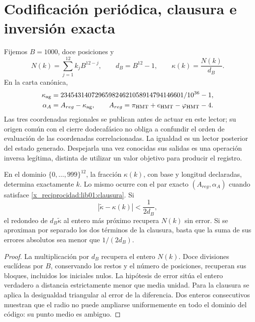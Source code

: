 \section{Codificación periódica, clausura e inversión exacta}
\label{x_reciprocidad:lib01:kappa}

Fijemos \(B=1000\), doce posiciones y
\[
 N(k)=\sum_{j=1}^{12}k_jB^{12-j},\qquad d_B=B^{12}-1,
 \qquad \kappa(k)=\frac{N(k)}{d_B}.
\]
En la carta canónica,
\begin{equation}
 \begin{aligned}
 \kappa_{\rm ag}
 &=\frac{234543140729659824621058914794146601}{10^{36}-1},\\
 \alpha_A&=A_{reg}-\kappa_{\rm ag},\qquad
 A_{reg}=\pi_{\rm HMT}+e_{\rm HMT}-\varphi_{\rm HMT}-4.
 \end{aligned}
 \label{x_reciprocidad:lib01:clausura}
\end{equation}
Las tres coordenadas regionales se publican antes de actuar en este lector;
su origen común con el cierre dodecafásico no obliga a confundir el orden de
evaluación de las coordenadas correlacionadas. La igualdad es un lector
posterior del estado generado. Despejarla una vez conocidas sus salidas es
una operación inversa legítima, distinta de utilizar un valor objetivo para
producir el registro.

\begin{proposition}
\label{x_reciprocidad:lib01:inversion-kappa}
En el dominio \(\{0,\ldots,999\}^{12}\), la fracción \(\kappa(k)\),
con base y longitud declaradas, determina exactamente \(k\). Lo mismo
ocurre con el par exacto \((A_{reg},\alpha_A)\) cuando satisface
\eqref{x_reciprocidad:lib01:clausura}. Si
\[
 |\widetilde\kappa-\kappa(k)|<\frac1{2d_B},
\]
el redondeo de \(d_B\widetilde\kappa\) al entero más próximo recupera
\(N(k)\) sin error. Si se aproximan por separado los dos términos de la
clausura, basta que la suma de sus errores absolutos sea menor que
\(1/(2d_B)\).
\end{proposition}
\begin{proof}
La multiplicación por \(d_B\) recupera el entero \(N(k)\).
Doce divisiones euclídeas por \(B\), conservando los restos y el número
de posiciones, recuperan sus bloques, incluidos los iniciales nulos. La
hipótesis de error sitúa el entero verdadero a distancia estrictamente
menor que media unidad. Para la clausura se aplica la desigualdad
triangular al error de la diferencia. Dos enteros consecutivos muestran
que el radio no puede ampliarse uniformemente en todo el dominio del
código: su punto medio es ambiguo.
\end{proof}

